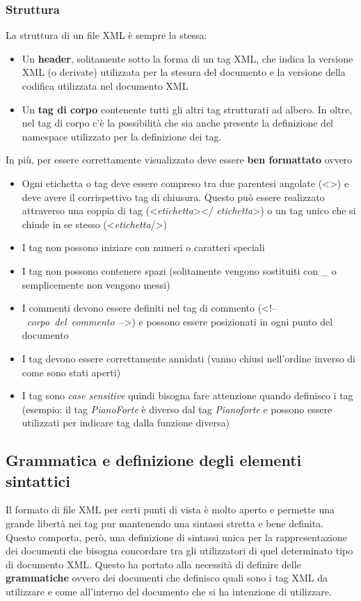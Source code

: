 \documentclass[a4paper,14pt]{article}
\begin{document}
\subsubsection{Struttura}
La struttura di un file XML è sempre la stessa:
\begin{itemize}
\item Un \textbf{header}, solitamente sotto la forma di un tag XML,  che indica la versione XML (o derivate) utilizzata per la stesura del documento e la versione della codifica utilizzata nel documento XML
\item Un \textbf{tag di corpo} contenente tutti gli altri tag strutturati ad albero. In oltre, nel tag di corpo c'è la possibilità che sia anche presente la definizione del namespace utilizzato per la definizione dei tag.
\end{itemize}
In più, per essere correttamente visualizzato deve essere \textbf{ben formattato} ovvero
\begin{itemize}
\item Ogni etichetta o tag deve essere compreso tra due parentesi angolate (<>) e deve avere il corrispettivo tag di chiusura. Questo può essere realizzato attraverso una coppia di tag (<\textit{etichetta}></ \textit{etichetta}>) o un tag unico che si chiude in se stesso (<\textit{etichetta}/>)
\item I tag non possono iniziare con numeri o caratteri speciali
\item I tag non possono contenere spazi (solitamente vengono sostituiti con \_ o semplicemente non vengono messi)
\item I commenti devono essere definiti nel tag di commento (<!--~\textit{corpo~del~commento}~-->) e possono essere posizionati in ogni punto del documento
\item I tag devono essere correttamente annidati (vanno chiusi nell'ordine inverso di come sono stati aperti)
\item I tag sono \textit{case sensitive} quindi bisogna fare attenzione quando definisco i tag (esempio: il tag \textit{PianoForte} è diverso dal tag \textit{Pianoforte} e possono essere utilizzati per indicare tag dalla funzione diversa)
\end{itemize}

\subsection{Grammatica e definizione degli elementi sintattici}
Il formato di file XML per certi punti di vista è molto aperto e permette una grande libertà nei tag pur mantenendo una sintassi stretta e bene definita.
Questo comporta, però, una definizione di sintassi unica per la rappresentazione dei documenti che bisogna concordare tra gli utilizzatori di quel determinato tipo di documento XML. Questo ha portato alla necessità di definire delle \textbf{grammatiche} ovvero dei documenti che definisco quali sono i tag XML da utilizzare e come all'interno del documento che si ha intenzione di utilizzare.
\end{document}
